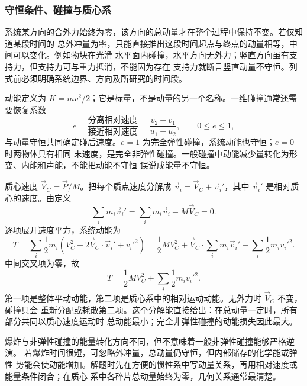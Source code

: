 \subsubsection*{守恒条件、碰撞与质心系}

系统某方向的合外力始终为零，该方向的总动量才在整个过程中保持不变。若仅知道某段时间的
总外冲量为零，只能直接推出这段时间起点与终点的动量相等，中间可以变化。例如物块在光滑
水平面内碰撞，水平方向无外力；竖直方向虽有支持力，但支持力可与重力抵消，不能因为存在
支持力就断言竖直动量不守恒。列式前必须明确系统边界、方向及所研究的时间段。

动能定义为 $K=mv^2/2$；它是标量，不是动量的另一个名称。一维碰撞通常还需要恢复系数
\begin{equation}
 e=\frac{\text{分离相对速度}}{\text{接近相对速度}}
 =\frac{v_2-v_1}{u_1-u_2},\qquad 0\leq e\leq1,
\end{equation}
与动量守恒共同确定碰后速度。$e=1$ 为完全弹性碰撞，系统动能也守恒；$e=0$ 时两物体具有相同
末速度，是完全非弹性碰撞。一般碰撞中动能减少量转化为形变、内能和声能，不能把动能不守恒
误说成能量不守恒。

质心速度 $\vec V_C=\vec P/M$。把每个质点速度分解成 $\vec v_i=\vec V_C+\vec v_i'$，其中
$\vec v_i'$ 是相对质心的速度。由定义
\[
 \sum_i m_i\vec v_i'=\sum_i m_i\vec v_i-M\vec V_C=0.
\]
逐项展开速度平方，系统动能为
\[
 T=\sum_i\frac12m_i(V_C^2+2\vec V_C\cdot\vec v_i'+{v_i'}^2)
 =\frac12MV_C^2+\vec V_C\cdot\sum_i m_i\vec v_i'+\sum_i\frac12m_i{v_i'}^2.
\]
中间交叉项为零，故
\begin{equation}
 T=\frac12MV_C^2+\sum_i\frac12m_i{v_i'}^2.
\end{equation}
第一项是整体平动动能，第二项是质心系中的相对运动动能。无外力时 $\vec V_C$ 不变，碰撞只会
重新分配或耗散第二项。这个分解能直接给出：在总动量一定时，所有部分共同以质心速度运动时
总动能最小；完全非弹性碰撞的动能损失因此最大。

爆炸与非弹性碰撞的能量转化方向不同，但不意味着一般非弹性碰撞能够严格逆演。
若爆炸时间很短，可忽略外冲量，总动量仍守恒，但内部储存的化学能或弹性
势能会使动能增加。解题时先在方便的惯性系中写动量关系，再用相对速度或能量条件闭合；在质心
系中各碎片总动量始终为零，几何关系通常最清楚。
